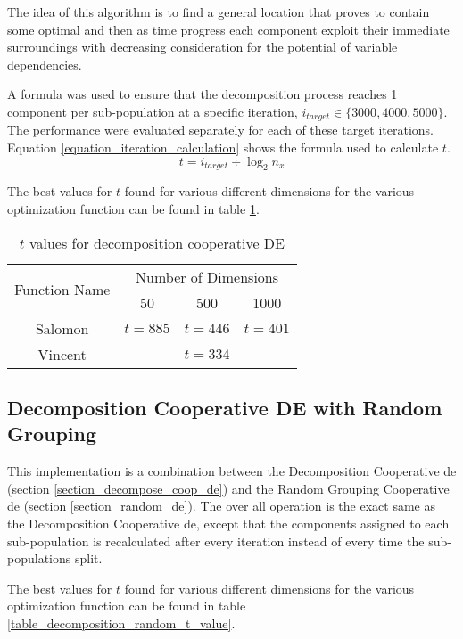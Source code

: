 \documentclass[hidelinks,english,conference]{IEEEtran}
\begin{document}
		The idea of this algorithm is to find a general location that proves to contain some optimal and then as time progress each component exploit their immediate surroundings with decreasing consideration for the potential of variable dependencies.
        
        A formula was used to ensure that the decomposition process reaches 1 component per sub-population at a specific iteration, $i_{target} \in \lbrace 3000, 4000, 5000 \rbrace$. The performance were evaluated separately for each of these target iterations. Equation \ref{equation_iteration_calculation} shows the formula used to calculate $t$.
        	\begin{equation}
				t = i_{target} \div \log_2 n_x
				\label{equation_iteration_calculation}
			\end{equation}

		The best values for $t$ found for various different dimensions for the various optimization function can be found in table \ref{table_decomposition_t_value}. 

		\begin{table}
			\centering
			\begin{tabular}{ | c | c | c | c | }
				\hline
				\multirow{2}{*}{Function Name} & \multicolumn{3}{|c|}{Number of Dimensions} \\\cline{2-4}
				 & 50 & 500 & 1000\\
				\hline
				Salomon & $t=885$ & $t=446$ & $t=401$ \\
				\hline
				Vincent && $t=334$ & \\
				\hline
			\end{tabular}
			\caption{$t$ values for decomposition cooperative DE}
			\label{table_decomposition_t_value}
		\end{table}

	\subsection{Decomposition Cooperative DE with Random Grouping} %
		This implementation is a combination between the Decomposition Cooperative \gls{de} (section \ref{section_decompose_coop_de}) and the Random Grouping Cooperative \gls{de} (section \ref{section_random_de}). The over all operation is the exact same as the Decomposition Cooperative \gls{de}, except that the components assigned to each sub-population is recalculated after every iteration instead of every time the sub-populations split.

		The best values for $t$ found for various different dimensions for the various optimization function can be found in table \ref{table_decomposition_random_t_value}. 
\end{document}
